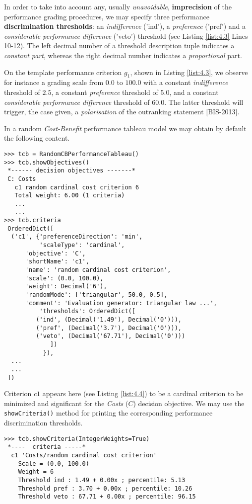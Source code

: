 In order to take into account any, usually \emph{unavoidable}, \textbf{imprecision} of the performance grading procedures, we may specify three performance \textbf{discrimination thresholds}: an \emph{indifference} ('ind'), a \emph{preference} ('pref') and a \emph{considerable performance difference} ('veto') threshold (see Listing \ref{list:4.3} Lines 10-12). The left decimal number of a threshold description tuple indicates a \emph{constant part}, whereas the right decimal number indicates a \emph{proportional} part.

On the template performance criterion $g_1$, shown in Listing \ref{list:4.3}, we observe for instance a grading scale from $0.0$ to $100.0$ with a constant \emph{indifference} threshold of $2.5$, a constant \emph{preference} threshold of $5.0$, and a constant \emph{considerable performance difference} threshold of $60.0$. The latter threshold  will trigger, the case given, a \emph{polarisation} of the outranking statement [BIS-2013].

In a random \emph{Cost-Benefit} performance tableau model we may obtain by default the following content.

\begin{lstlisting}[caption={Example of cardinal Costs criterion},label=list:4.4,basicstyle=\footnotesize]
>>> tcb = RandomCBPerformanceTableau()
>>> tcb.showObjectives()
 *------ decision objectives -------*
 C: Costs
   c1 random cardinal cost criterion 6
   Total weight: 6.00 (1 criteria)
   ...
   ...
>>> tcb.criteria
 OrderedDict([
  ('c1', {'preferenceDirection': 'min',
          'scaleType': 'cardinal',
	  'objective': 'C',
	  'shortName': 'c1',
	  'name': 'random cardinal cost criterion',
	  'scale': (0.0, 100.0),
	  'weight': Decimal('6'),
	  'randomMode': ['triangular', 50.0, 0.5],
	  'comment': 'Evaluation generator: triangular law ...',
          'thresholds': OrderedDict([
	     ('ind', (Decimal('1.49'), Decimal('0'))),
	     ('pref', (Decimal('3.7'), Decimal('0'))),
	     ('veto', (Decimal('67.71'), Decimal('0')))
             ])
           }),
  ...
  ...
 ])
\end{lstlisting}

Criterion $c1$ appears here (see Listing \ref{list:4.4}) to be a cardinal criterion to be minimized and significant for the \emph{Costs} ($C$) decision objective. We may use the {\tt showCriteria()} method for printing the corresponding performance discrimination thresholds.

\begin{lstlisting}[basicstyle=\footnotesize]
>>> tcb.showCriteria(IntegerWeights=True)
 *----  criteria -----*
  c1 'Costs/random cardinal cost criterion'
    Scale = (0.0, 100.0)
    Weight = 6 
    Threshold ind : 1.49 + 0.00x ; percentile: 5.13
    Threshold pref : 3.70 + 0.00x ; percentile: 10.26
    Threshold veto : 67.71 + 0.00x ; percentile: 96.15
\end{lstlisting}

